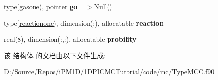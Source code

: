 \begin{DoxyCompactItemize}
type(gasone), pointer {\bfseries go} =$>$Null()
\item 
\mbox{\label{structmoduletypemcc_1_1mccbundle_a64e7daef9a9a466ec18a9ddc7398072b}} 
type(\mbox{\hyperlink{structmoduletypemcc_1_1reactionone}{reactionone}}), dimension(\+:), allocatable {\bfseries reaction}
\item 
\mbox{\label{structmoduletypemcc_1_1mccbundle_ae99ff33630269095e9ed145fb300a456}} 
real(8), dimension(\+:,\+:), allocatable {\bfseries probility}
\end{DoxyCompactItemize}


该 结构体 的文档由以下文件生成\+:\begin{DoxyCompactItemize}
\item 
D\+:/\+Source/\+Repos/i\+P\+M1\+D/1\+D\+P\+I\+C\+M\+C\+Tutorial/code/mc/Type\+M\+C\+C.\+f90\end{DoxyCompactItemize}
